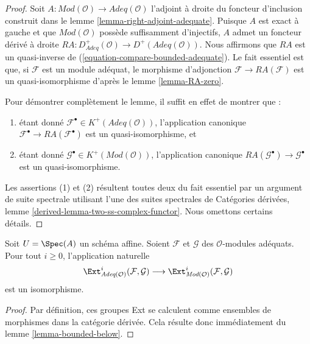 \begin{proof}
Soit $A : \textit{Mod}(\mathcal{O}) \to \textit{Adeq}(\mathcal{O})$
l'adjoint à droite du foncteur d'inclusion construit dans le
lemme \ref{lemma-right-adjoint-adequate}.
Puisque $A$ est exact à gauche et que $\textit{Mod}(\mathcal{O})$
possède suffisamment d'injectifs, $A$ admet un foncteur dérivé à droite
$RA : D^+_{\textit{Adeq}}(\mathcal{O}) \to D^+(\textit{Adeq}(\mathcal{O}))$.
Nous affirmons que $RA$ est un quasi-inverse de
(\ref{equation-compare-bounded-adequate}).
Le fait essentiel est que, si $\mathcal{F}$ est un module adéquat,
le morphisme d'adjonction $\mathcal{F} \to RA(\mathcal{F})$ est un
quasi-isomorphisme d'après le lemme \ref{lemma-RA-zero}.

\medskip\noindent
Pour démontrer complètement le lemme, il suffit en effet de montrer que :
\begin{enumerate}
\item étant donné $\mathcal{F}^\bullet \in K^+(\textit{Adeq}(\mathcal{O}))$,
l'application canonique $\mathcal{F}^\bullet \to RA(\mathcal{F}^\bullet)$
est un quasi-isomorphisme, et
\item étant donné $\mathcal{G}^\bullet \in K^+(\textit{Mod}(\mathcal{O}))$,
l'application canonique $RA(\mathcal{G}^\bullet) \to \mathcal{G}^\bullet$
est un quasi-isomorphisme.
\end{enumerate}
Les assertions (1) et (2) résultent toutes deux du fait essentiel par un argument
de suite spectrale utilisant l'une des suites spectrales de
Catégories dérivées, lemme \ref{derived-lemma-two-ss-complex-functor}.
Nous omettons certains détails.
\end{proof}

\begin{lemma}
\label{lemma-ext-adequate}
Soit $U = \Spec(A)$ un schéma affine.
Soient $\mathcal{F}$ et $\mathcal{G}$ des $\mathcal{O}$-modules adéquats.
Pour tout $i \geq 0$, l'application naturelle
$$
\Ext^i_{\textit{Adeq}(\mathcal{O})}(\mathcal{F}, \mathcal{G})
\longrightarrow
\Ext^i_{\textit{Mod}(\mathcal{O})}(\mathcal{F}, \mathcal{G})
$$
est un isomorphisme.
\end{lemma}

\begin{proof}
Par définition, ces groupes Ext se calculent comme ensembles de morphismes dans
la catégorie dérivée. Cela résulte donc immédiatement du
lemme \ref{lemma-bounded-below}.
\end{proof}










